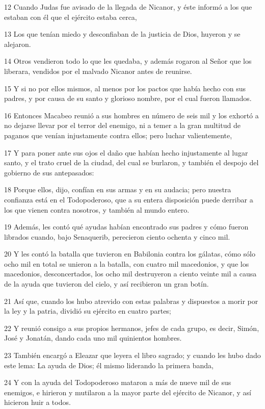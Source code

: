 \par 12 Cuando Judas fue avisado de la llegada de Nicanor, y éste informó a los que estaban con él que el ejército estaba cerca,
\par 13 Los que tenían miedo y desconfiaban de la justicia de Dios, huyeron y se alejaron.
\par 14 Otros vendieron todo lo que les quedaba, y además rogaron al Señor que los liberara, vendidos por el malvado Nicanor antes de reunirse.
\par 15 Y si no por ellos mismos, al menos por los pactos que había hecho con sus padres, y por causa de su santo y glorioso nombre, por el cual fueron llamados.
\par 16 Entonces Macabeo reunió a sus hombres en número de seis mil y los exhortó a no dejarse llevar por el terror del enemigo, ni a temer a la gran multitud de paganos que venían injustamente contra ellos; pero luchar valientemente,
\par 17 Y para poner ante sus ojos el daño que habían hecho injustamente al lugar santo, y el trato cruel de la ciudad, del cual se burlaron, y también el despojo del gobierno de sus antepasados:
\par 18 Porque ellos, dijo, confían en sus armas y en su audacia; pero nuestra confianza está en el Todopoderoso, que a su entera disposición puede derribar a los que vienen contra nosotros, y también al mundo entero.
\par 19 Además, les contó qué ayudas habían encontrado sus padres y cómo fueron librados cuando, bajo Senaquerib, perecieron ciento ochenta y cinco mil.
\par 20 Y les contó la batalla que tuvieron en Babilonia contra los gálatas, cómo sólo ocho mil en total se unieron a la batalla, con cuatro mil macedonios, y que los macedonios, desconcertados, los ocho mil destruyeron a ciento veinte mil a causa de la ayuda que tuvieron del cielo, y así recibieron un gran botín.
\par 21 Así que, cuando los hubo atrevido con estas palabras y dispuestos a morir por la ley y la patria, dividió su ejército en cuatro partes;
\par 22 Y reunió consigo a sus propios hermanos, jefes de cada grupo, es decir, Simón, José y Jonatán, dando cada uno mil quinientos hombres.
\par 23 También encargó a Eleazar que leyera el libro sagrado; y cuando les hubo dado este lema: La ayuda de Dios; él mismo liderando la primera banda,
\par 24 Y con la ayuda del Todopoderoso mataron a más de nueve mil de sus enemigos, e hirieron y mutilaron a la mayor parte del ejército de Nicanor, y así hicieron huir a todos.
